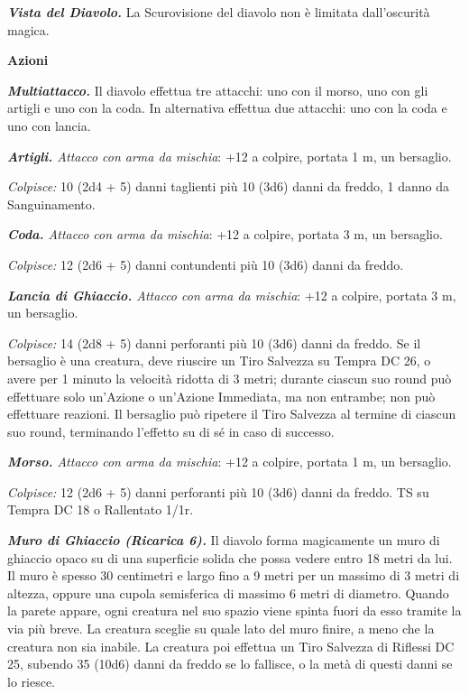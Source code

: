 \begin{multicols}{2}
{\emph{\textbf{Vista del Diavolo.}} La Scurovisione del diavolo non è limitata dall'oscurità magica.

\textbf{Azioni}

\emph{\textbf{Multiattacco.}} Il diavolo effettua tre attacchi: uno con il morso, uno con gli artigli e uno con la coda. In alternativa effettua due attacchi: uno con la coda e uno con lancia.

\emph{\textbf{Artigli.} Attacco con arma da mischia}: +12 a colpire, portata 1 m, un bersaglio.

\emph{Colpisce:} 10 (2d4 + 5) danni taglienti più 10 (3d6) danni da freddo, 1 danno da Sanguinamento.

\emph{\textbf{Coda.} Attacco con arma da mischia}: +12 a colpire, portata 3 m, un bersaglio.

\emph{Colpisce:} 12 (2d6 + 5) danni contundenti più 10 (3d6) danni da freddo.

\emph{\textbf{Lancia di Ghiaccio.} Attacco con arma da mischia}: +12 a colpire, portata 3 m, un bersaglio.

\emph{Colpisce:} 14 (2d8 + 5) danni perforanti più 10 (3d6) danni da freddo. Se il bersaglio è una creatura, deve riuscire un Tiro Salvezza su Tempra DC 26, o avere per 1 minuto la velocità ridotta di 3 metri; durante ciascun suo round può effettuare solo un'Azione o un'Azione Immediata, ma non entrambe; non può effettuare reazioni. Il bersaglio può ripetere il Tiro Salvezza al termine di ciascun suo round, terminando l'effetto su di sé in caso di successo.

\emph{\textbf{Morso.} Attacco con arma da mischia}: +12 a colpire, portata 1 m, un bersaglio.

\emph{Colpisce:} 12 (2d6 + 5) danni perforanti più 10 (3d6) danni da freddo. TS su Tempra DC 18 o Rallentato 1/1r.

\emph{\textbf{Muro di Ghiaccio (Ricarica 6).}} Il diavolo forma magicamente un muro di ghiaccio opaco su di una superficie solida che possa vedere entro 18 metri da lui. Il muro è spesso 30 centimetri e largo fino a 9 metri per un massimo di 3 metri di altezza, oppure una cupola semisferica di massimo 6 metri di diametro. Quando la parete appare, ogni creatura nel suo spazio viene spinta fuori da esso tramite la via più breve. La creatura sceglie su quale lato del muro finire, a meno che la creatura non sia inabile. La creatura poi effettua un Tiro Salvezza di Riflessi DC 25, subendo 35 (10d6) danni da freddo se lo fallisce, o la metà di questi danni se lo riesce.

}
\end{multicols}
